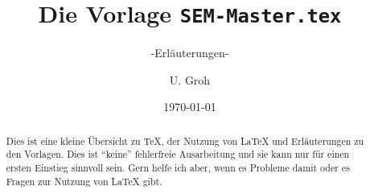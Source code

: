 \documentclass[%
	,ngerman
	,DIV			= calc 
	,toc			= bib
	,abstract		= true
	,parskip		= half+
	,toc 		= numberline
		]{scrartcl}
\title{Die Vorlage \texttt{SEM-Master.tex}}
\subtitle{-Erläuterungen-}
\date{\today}
\author{U. Groh}
\begin{document}

\maketitle
\tableofcontents
\thispagestyle{empty}

\begin{abstract}
Dies ist eine kleine Übersicht zu \TeX{}, der Nutzung von \LaTeX{} und Erläuterungen zu den Vorlagen.
Dies ist \enquote{keine} fehlerfreie Ausarbeitung und sie kann nur für einen ersten Einstieg sinnvoll sein.
Gern helfe ich aber, wenn es Probleme damit oder es Fragen zur Nutzung von \LaTeX{} gibt.
\end{abstract}








\nocite{voss:2012a,lamport:1986}
\printbibliography
%
\end{document}
